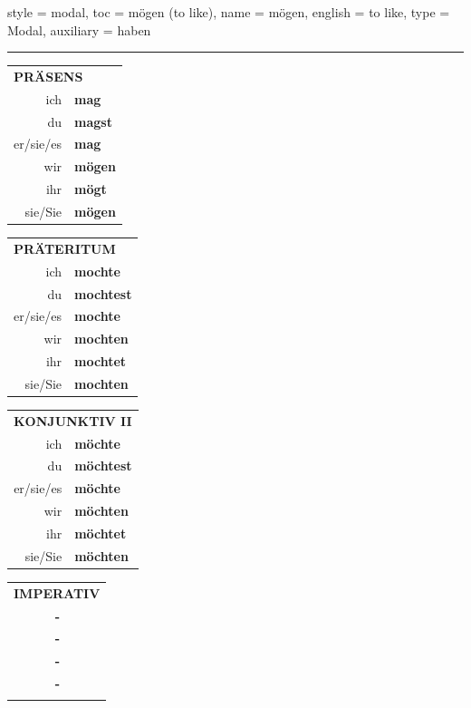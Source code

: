 \begin{verbentry}{
  style = {modal},
  toc = {mögen (to like)},
  name = {mögen},
  english = {to like},
  type = {Modal},
  auxiliary = {haben}
}
 
     \vspace{5pt}
    \hrule
    \vspace{5pt}
  \begin{tabular}{rl}
     \multicolumn{2}{l}{\textbf{PRÄSENS} }\\
    ich & \textbf{mag}\\
    du & \textbf{magst}\\
    er/sie/es & \textbf{mag}\\
    wir & \textbf{mögen}\\
    ihr & \textbf{mögt}\\
    sie/Sie & \textbf{mögen}\\
  \end{tabular}
  \hfill
     \begin{tabular}{rl}
    \multicolumn{2}{l}{\textbf{PRÄTERITUM} }\\
    ich & \textbf{mochte}\\
    du & \textbf{mochtest}\\
    er/sie/es & \textbf{mochte}\\
    wir & \textbf{mochten}\\
    ihr & \textbf{mochtet}\\
    sie/Sie & \textbf{mochten}\\
  \end{tabular}
    \hfill
     \begin{tabular}{rl}
    \multicolumn{2}{l}{\textbf{KONJUNKTIV II} }\\
    ich & \textbf{möchte}\\
    du & \textbf{möchtest}\\
    er/sie/es & \textbf{möchte}\\
    wir & \textbf{möchten}\\
    ihr & \textbf{möchtet}\\
    sie/Sie & \textbf{möchten}\\
  \end{tabular}
  \hfill
  \begin{tabular}{rl}
     \multicolumn{2}{l}{\textbf{IMPERATIV} }\\
   & \textbf{-}\\
   & \textbf{-}\\
   & \textbf{-}\\
   & \textbf{-}\\
   & \vspace{10pt}
  \end{tabular}


\end{verbentry}
